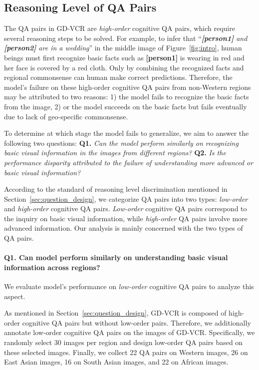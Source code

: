 \documentclass[11pt]{article}
\begin{document}
\subsection{Reasoning Level of QA Pairs}
The QA pairs in GD-VCR are \emph{high-order} cognitive QA pairs, which require several reasoning steps to be solved. For example, to infer that ``\textit{\colorbox[rgb]{ .891,  .891,  .891}{\textbf{[person1]}} and \colorbox[rgb]{ .891,  .891,  .891}{\textbf{[person2]}} are in a wedding}'' in the middle image of Figure~\ref{fig:intro}, human beings must first recognize basic facts such as \colorbox[rgb]{ .891,  .891,  .891}{\textbf{[person1]}} is wearing in red and her face is covered by a red cloth. Only by combining the recognized facts and regional commonsense can human make correct predictions.
Therefore, the model's failure on these high-order cognitive QA pairs from non-Western regions may be attributed to two reasons: 1) the model fails to recognize the basic facts from the image, 2) or the model succeeds on the basic facts but fails eventually due to lack of geo-specific commonsense.

To determine at which stage the model fails to generalize, we aim to answer the following two questions: \textbf{Q1.} \emph{Can the model perform similarly on recognizing basic visual information in the images from different regions?} \textbf{Q2.} \emph{Is the performance disparity attributed to the failure of understanding more advanced or basic visual information?}

According to the standard of reasoning level discrimination mentioned in Section~\ref{sec:question_design}, we categorize QA pairs into two types: \emph{low-order} and \emph{high-order} cognitive QA pairs. \emph{Low-order} cognitive QA pairs correspond to the inquiry on basic visual information, while \emph{high-order} QA pairs involve more advanced information.
Our analysis is mainly concerned with the two types of QA pairs.

\paragraph{Q1. Can model perform similarly on understanding basic visual information across regions?}
We evaluate model's performance on \emph{low-order} cognitive QA pairs to analyze this aspect.

As mentioned in Section~\ref{sec:question_design}, GD-VCR is composed of high-order cognitive QA pairs but without low-order pairs. Therefore, we additionally annotate low-order cognitive QA pairs on the images of GD-VCR. Specifically, we randomly select 30 images per region and design low-order QA pairs based on these selected images. Finally, we collect 22 QA pairs on Western images, 26 on East Asian images, 16 on South Asian images, and 22 on African images.
\end{document}
